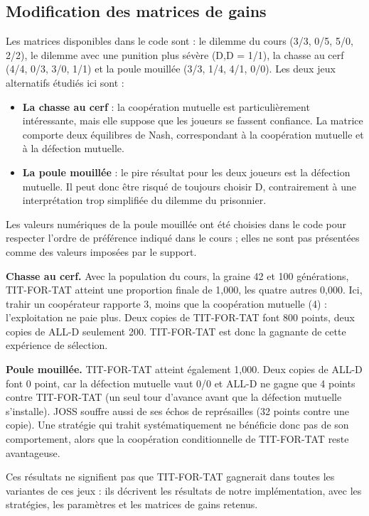 \documentclass[10pt,a4paper]{article}
\begin{document}
\subsection{Modification des matrices de gains}
Les matrices disponibles dans le code sont : le dilemme du cours (3/3, 0/5, 5/0, 2/2), le dilemme avec une punition plus
sévère (D,D = 1/1), la chasse au cerf (4/4, 0/3, 3/0, 1/1) et la poule mouillée (3/3, 1/4, 4/1, 0/0). Les deux jeux
alternatifs étudiés ici sont :
\begin{itemize}
  \item \textbf{La chasse au cerf} : la coopération mutuelle est particulièrement intéressante, mais elle suppose que les
  joueurs se fassent confiance. La matrice comporte deux équilibres de Nash, correspondant à la coopération mutuelle et à la
  défection mutuelle.
  \item \textbf{La poule mouillée} : le pire résultat pour les deux joueurs est la défection mutuelle. Il peut donc être
  risqué de toujours choisir D, contrairement à une interprétation trop simplifiée du dilemme du prisonnier.
\end{itemize}
Les valeurs numériques de la poule mouillée ont été choisies dans le code pour respecter l'ordre de préférence indiqué dans le
cours ; elles ne sont pas présentées comme des valeurs imposées par le support.

\textbf{Chasse au cerf.} Avec la population du cours, la graine 42 et 100 générations, TIT-FOR-TAT atteint une proportion
finale de 1,000, les quatre autres 0,000. Ici, trahir un coopérateur rapporte 3, moins que la coopération mutuelle (4) :
l'exploitation ne paie plus. Deux copies de TIT-FOR-TAT font 800 points, deux copies de ALL-D seulement 200. TIT-FOR-TAT est
donc la gagnante de cette expérience de sélection.

\textbf{Poule mouillée.} TIT-FOR-TAT atteint également 1,000. Deux copies de ALL-D font 0 point, car la défection mutuelle vaut
0/0 et ALL-D ne gagne que 4 points contre TIT-FOR-TAT (un seul tour d'avance avant que la défection mutuelle s'installe).
JOSS souffre aussi de ses échos de représailles (32 points contre une copie). Une stratégie qui trahit systématiquement ne
bénéficie donc pas de son comportement, alors que la coopération conditionnelle de TIT-FOR-TAT reste avantageuse.

Ces résultats ne signifient pas que TIT-FOR-TAT gagnerait dans toutes les variantes de ces jeux : ils décrivent les résultats de
notre implémentation, avec les stratégies, les paramètres et les matrices de gains retenus.
\end{document}
